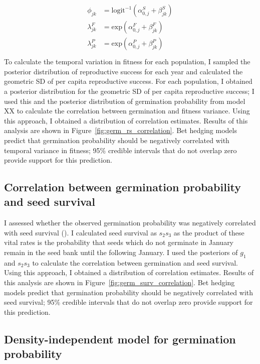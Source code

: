 \documentclass[12pt, oneside, titlepage]{article}   	%
\begin{document}
\begin{align}
  \begin{split}
\phi_{jk} & = \mathrm{logit}^{-1}(\alpha^S_{0,j} + \beta^S_{jk}) \\
\lambda^F_{jk} & = \mathrm{exp}(\alpha^F_{0,j} + \beta^F_{jk}) \\
\lambda^P_{jk} & = \mathrm{exp}(\alpha^P_{0,j} + \beta^P_{jk}) \\
  \end{split}
\end{align}
%
To calculate the temporal variation in fitness for each population, I sampled the posterior distribution of reproductive success for each year and calculated the geometric SD of per capita reproductive success. For each population, I obtained a posterior distribution for the geometric SD of per capita reproductive success; I used this and the posterior distribution of germination probability from model XX to calculate the correlation between germination and fitness variance. Using this approach, I obtained a distribution of correlation estimates. Results of this analysis are shown in Figure~\ref{fig:germ_rs_correlation}. Bet hedging models predict that germination probability should be negatively correlated with temporal variance in fitness; 95\% credible intervals that do not overlap zero provide support for this prediction.

\subsection*{Correlation between germination probability and seed survival}

I assessed whether the observed germination probability was negatively correlated with seed survival (\cite{gremer2014}). I calculated seed survival as $s_2 s_3$ as the product of these vital rates is the probability that seeds which do not germinate in January remain in the seed bank until the following January. I used the posteriors of $g_1$ and $s_2 s_3$ to calculate the correlation between germination and seed survival. Using this approach, I obtained a distribution of correlation estimates. Results of this analysis are shown in Figure~\ref{fig:germ_surv_correlation}. Bet hedging models predict that germination probability should be negatively correlated with seed survival; 95\% credible intervals that do not overlap zero provide support for this prediction.

\subsection*{Density-independent model for germination probability}
\end{document}
